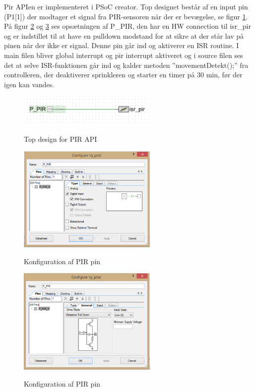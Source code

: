 Pir APIen er implementeret i PSoC creator. Top designet består af en input pin (P1[1]) der modtager et signal fra PIR-sensoren når der er bevægelse, se figur \ref{lab:pir_topdesign}. På figur \ref{lab:pir_topdesign_1} og \ref{lab:pir_topdesign_2} ses opsætningen af P\_PIR, den har en HW connection til isr\_pir og er indstillet til at have en pulldown modstand for at sikre at der står lav på pinen når der ikke er signal. Denne pin går ind og aktiverer en ISR routine. I main filen bliver global interrupt og pir interrupt aktiveret og i source filen ses det at selve ISR-funktionen går ind og kalder metoden ''movementDetekt();'' fra controlleren, der deaktiverer sprinkleren og starter en timer på 30 min, før der igen kan vandes.


\begin{figure}[htb]
\centering
{\includegraphics[width=0.60\textwidth]{filer/pics/pir_api_topdesign}}
\caption{Top design for PIR API}
\label{lab:pir_topdesign}
\end{figure}

\begin{figure}[htb]
\centering
{\includegraphics[width=0.60\textwidth]{filer/pics/pir_api_topdesign_1}}
\caption{Konfiguration af PIR pin}
\label{lab:pir_topdesign_1}
\end{figure}

\begin{figure}[H]
\centering
{\includegraphics[width=0.60\textwidth]{filer/pics/pir_api_topdesign_2}}
\caption{Konfiguration af PIR pin}
\label{lab:pir_topdesign_2}
\end{figure}

